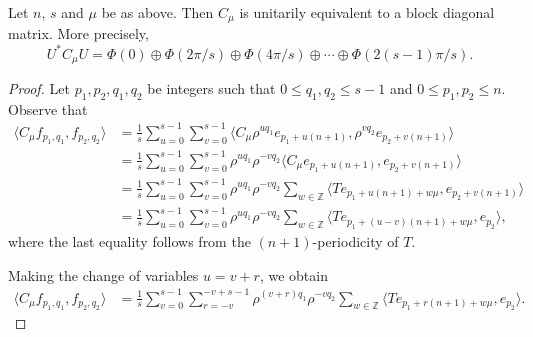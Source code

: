 \documentclass[10pt,a4paper]{amsart}
\begin{document}
\begin{proposition}\label{prop:Cmu}
Let $n$, $s$ and $\mu$ be as above. Then $C_\mu$ is unitarily equivalent to a block diagonal matrix. More precisely,   
\[
  U^{*}C_{\mu} U=\Phi(0) \oplus \Phi(2\pi/s) \oplus \Phi(4\pi/s) \oplus \cdots \oplus \Phi(2(s-1)\pi/s).
  \]
\end{proposition}

\begin{proof}
Let $p_1, p_2, q_1, q_2$ be integers such that $0 \leq q_1, q_2 \leq s-1$ and $0\leq p_1, p_2 \leq n$. Observe that
\begin{align*}
   \langle C_{\mu} f_{p_1, q_1}, f_{p_2, q_2} \rangle 
   & =\frac{1}{s} \sum_{u=0}^{s-1} \sum_{v=0}^{s-1} \langle C_{\mu} \rho^{u q_1} e_{p_1+u (n+1)}, \rho^{v q_2} e_{p_2+v (n+1)} \rangle \\
   &=\frac{1}{s}\sum_{u=0}^{s-1} \sum_{v=0}^{s-1}  \rho^{u q_1} \rho^{-v q_2}\langle C_{\mu} e_{p_1+u (n+1)}, e_{p_2+v (n+1)} \rangle \\ 
   &=\frac{1}{s}\sum_{u=0}^{s-1} \sum_{v=0}^{s-1}  \rho^{u q_1} \rho^{-v q_2}  \sum_{w \in {\mathbb Z}}  \langle 
      T e_{p_1 +u (n+1) +w \mu}, e_{p_2 +v (n+1)} \rangle \\
&=\frac{1}{s}\sum_{u=0}^{s-1} \sum_{v=0}^{s-1} \rho^{u q_1} \rho^{-v q_2} \sum_{w \in {\mathbb Z}}  \langle
      T e_{p_1 +(u-v) (n+1) +w \mu}, e_{p_2} \rangle,   
\end{align*}
where the last equality follows from the $(n+1)$-periodicity of $T$.

Making the change of variables $u=v+r$, we obtain
\begin{align*}
   \langle C_{\mu} f_{p_1, q_1}, f_{p_2, q_2} \rangle 
   & =\frac{1}{s}\sum_{v=0}^{s-1} \sum_{r=-v}^{-v+s-1}  \rho^{(v+r)q_1} \rho^{-v q_2}  \sum_{w \in {\mathbb Z}}  \langle
      T e_{p_1 + r (n+1) +w \mu}, e_{p_2} \rangle.
    \end{align*}
    

\end{proof}
\end{document}
